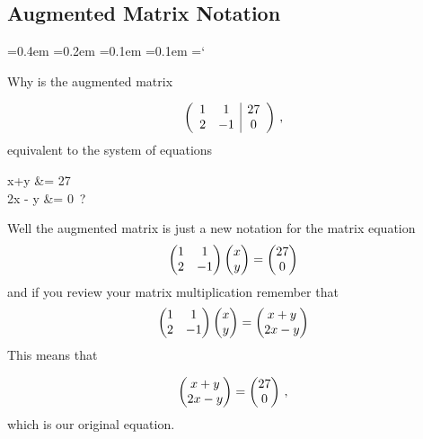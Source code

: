 \subsection*{Augmented Matrix Notation}

{\ttfamily
{}\font=0.4em
\font=0.2em
\font=0.1em
\font=0.1em
\hyphenchar\font=`\-


\hypertarget{script_gaussian_elimination_more}{Why is the augmented  matrix} 
\[ \left( \begin{array}{cc | c}
1 & 1 & 27 \\
2 & -1 & 0  
\end{array} \right)\, ,
\]
equivalent to the system of equations
\begin{aling*}
 x+y &= 27\\
 2x - y &= 0\, ?
\end{aling*}
Well the augmented matrix is just a new notation for the matrix equation
\begin{equation*}
    \begin{pmatrix}
      1             &1  \\
      2             &-1
    \end{pmatrix}
  \begin{pmatrix} x \\ y \end{pmatrix}
  =
  \begin{pmatrix} 27 \\ 0 \end{pmatrix}
\end{equation*}
and if you review your matrix multiplication remember that 
\begin{equation*}
    \begin{pmatrix}
      1             &1  \\
      2             &-1
    \end{pmatrix}
  \begin{pmatrix} x \\ y \end{pmatrix}
  =
  \begin{pmatrix} x+ y \\ 2x - y \end{pmatrix}
\end{equation*}
This means that

\begin{equation*}
  \begin{pmatrix} x+ y \\ 2x - y \end{pmatrix}
  =
  \begin{pmatrix} 27 \\ 0 \end{pmatrix}\, ,
\end{equation*}
which is our original equation.

}

